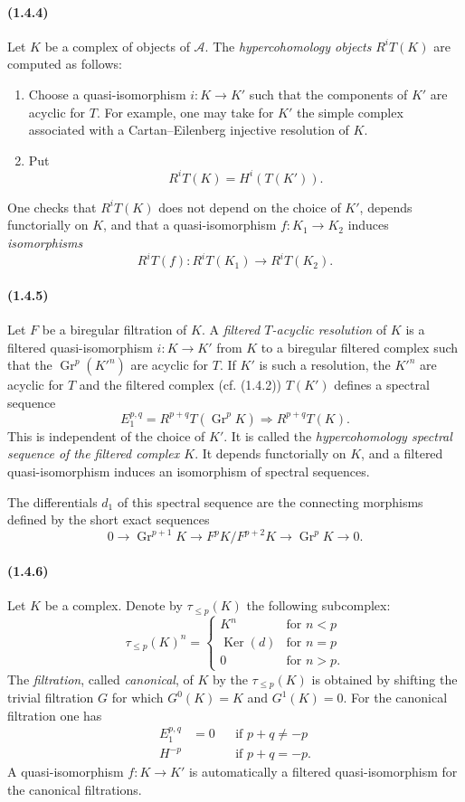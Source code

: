 \documentclass[10pt]{article}
\newcommand{\Gr}{\operatorname{Gr}}
\newcommand{\Ker}{\operatorname{Ker}}
\newcommand{\calA}{\mathcal A}
\begin{document}
\paragraph{(1.4.4)} Let $K$ be a complex of objects of $\calA$. The \emph{hypercohomology objects} $R^iT(K)$ are computed as follows:
\begin{enumerate}[label=\alph*)]
\item Choose a quasi-isomorphism $i:K\to K'$ such that the components of $K'$ are acyclic for $T$. For example, one may take for $K'$ the simple complex associated with a Cartan--Eilenberg injective resolution of $K$.
\item Put
\[
R^iT(K)=H^i(T(K')).
\]
\end{enumerate}
One checks that $R^iT(K)$ does not depend on the choice of $K'$, depends functorially on $K$, and that a quasi-isomorphism $f:K_1\to K_2$ induces \emph{isomorphisms}
\[
R^iT(f):R^iT(K_1)\longrightarrow R^iT(K_2).
\]

\paragraph{(1.4.5)} Let $F$ be a biregular filtration of $K$. A \emph{filtered $T$-acyclic resolution} of $K$ is a filtered quasi-isomorphism $i:K\to K'$ from $K$ to a biregular filtered complex such that the $\Gr^p(K'^n)$ are acyclic for $T$. If $K'$ is such a resolution, the $K'^n$ are acyclic for $T$ and the filtered complex (cf. (1.4.2)) $T(K')$ defines a spectral sequence
\[
E_1^{p,q}=R^{p+q}T(\Gr^pK)\Rightarrow R^{p+q}T(K).
\]
This is independent of the choice of $K'$. It is called the \emph{hypercohomology spectral sequence of the filtered complex $K$}. It depends functorially on $K$, and a filtered quasi-isomorphism induces an isomorphism of spectral sequences.

The differentials $d_1$ of this spectral sequence are the connecting morphisms defined by the short exact sequences
\[
0\to\Gr^{p+1}K\to F^pK/F^{p+2}K\to\Gr^pK\to0.
\]

\paragraph{(1.4.6)} Let $K$ be a complex. Denote by $\tau_{\le p}(K)$ the following subcomplex:
\[
\tau_{\le p}(K)^n=\begin{cases}
K^n& \text{for }n<p\\
\Ker(d)& \text{for }n=p\\
0& \text{for }n>p.
\end{cases}
\]
The \emph{filtration}, called \emph{canonical}, of $K$ by the $\tau_{\le p}(K)$ is obtained by shifting the trivial filtration $G$ for which $G^0(K)=K$ and $G^1(K)=0$. For the canonical filtration one has
\[
\begin{aligned}
E_1^{p,q}&=0 &&\text{if }p+q\ne-p\\
H^{-p} &&&\text{if }p+q=-p.
\end{aligned}
\]
A quasi-isomorphism $f:K\to K'$ is automatically a filtered quasi-isomorphism for the canonical filtrations.
\end{document}
